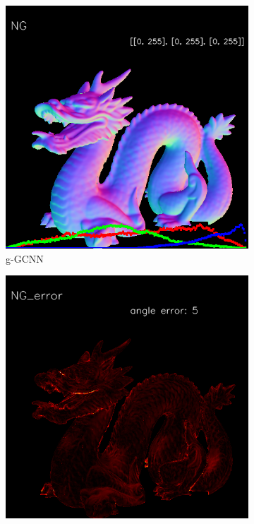 \begin{figure}[h!]
\begin{subfigure}[b]{0.19\linewidth}
		\includegraphics[width=\linewidth]{./Figures/ng-synthetic/fancy_eval_3_normal_NG.png}
		\caption{g-GCNN}
	\end{subfigure}
	\begin{subfigure}[b]{0.19\linewidth}
		\includegraphics[width=\linewidth]{./Figures/ng-synthetic/fancy_eval_3_error_NG.png}

\end{subfigure}
\end{figure}
